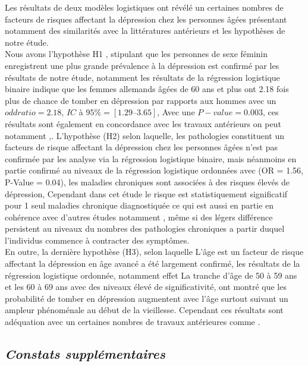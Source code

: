 \documentclass[a4paper]{article}
\begin{document}
Les résultats de deux modèles logistiques ont révélé un certaines nombres de facteurs de risques affectant la dépression chez les personnes âgées présentant notamment des similarités avec la littératures antérieurs et les hypothèses de notre étude.\\
Nous avons l’hypothèse H1 , stipulant que les personnes de sexe féminin enregistrent une plus grande prévalence à la dépression est confirmé par les résultats de notre étude, notamment les résultats de la régression logistique binaire  indique que les femmes allemands âgées de 60 ans et plus ont 2.18 fois plus de chance de tomber en dépression par rapports aux hommes avec un $odd ratio = 2.18$, $IC$ à $95\%  = [1.29 – 3.65]$, Avec une  $P-value = 0.003$, ces résultats sont également en concordance avec les travaux antérieurs on peut notamment \cite{Cousteaux2008},\cite{phac_chronic_diseases}. L’hypothèse (H2) selon laquelle,  les pathologies constituent un facteurs de risque affectant la dépression chez les personnes âgées n’est pas confirmée par les analyse via la régression logistique binaire, mais néanmoins en partie confirmé au niveaux de la régression logistique ordonnées avec (OR = 1.56, P-Value = 0.04), les maladies chroniques sont associées à des risques élevés de dépression, Cependant dans cet étude le risque est statistiquement significatif pour 1 seul maladies chronique diagnostiquée ce qui est aussi en partie en cohérence avec d’autres études notamment \cite{Yunming2012},\citep{Hammami2012} même si des légers différence persistent au niveaux du nombres des pathologies chroniques a partir duquel l’individus commence à contracter des symptômes.\\
En outre, la dernière hypothèse (H3), selon laquelle L'âge est un facteur de risque affectant la dépression en âge avancé a été largement confirmé, les résultats de la régression logistique ordonnée, notamment effet La tranche d’âge de 50 à 59 ans et les 60 à 69 ans avec des niveaux élevé de significativité, ont montré que les probabilité de tomber en dépression augmentent avec l’âge surtout suivant un ampleur phénoménale au début de la vieillesse. Cependant ces résultats sont adéquation avec un certaines nombres de travaux antérieures comme \citep{phac_chronic_diseases}.

\subsection{\textbf{\textit{Constats supplémentaires  }}} 
\end{document}
